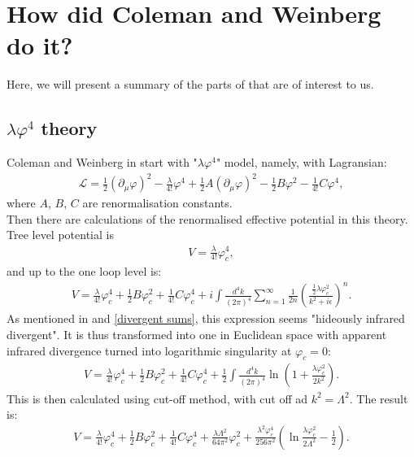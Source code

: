 \chapter{How did Coleman and Weinberg do it?}\label{CWchapter}
Here, we will present a summary of the parts of \citeColWein that are of interest to us. \\

\section{\texorpdfstring{$\lambda\varphi^4$}{Lambda phi to the fourth} theory}
Coleman and Weinberg in \cite{Coleman1973} start with "$\lambda\varphi^4$" model, namely, with 
Lagransian:
\begin{align}
\mathcal{L} = \frac{1}{2}(\partial_\mu\varphi)^2-\frac{\lambda}{4!}\varphi^4+\frac{1}{2}
A(\partial_\mu\varphi)^2-\frac{1}{2}B\varphi^2-\frac{1}{4!}C\varphi^4,
\end{align}
where $A$, $B$, $C$ are renormalisation constants. \\
Then there are calculations of the renormalised effective potential in this theory. \\
Tree level potential is
\begin{align}
V=\frac{\lambda}{4!}\varphi_c^4,
\end{align}
and up to the one loop level is:
\begin{align}
V = \frac{\lambda}{4!}\varphi_c^4+\frac{1}{2}B\varphi_c^2+\frac{1}{4!}C\varphi_c^4 + 
i\int\frac{d^4k}{(2\pi)^4}\sum\limits_{n=1}^\infty\frac{1}{2n}
\left(\frac{\frac{1}{2}\lambda\varphi_c^2}{k^2+i\epsilon}\right)^n.
\end{align} 
As mentioned in \cite{Coleman1973} and 
\ref{divergent sums}, this expression seems "hideously infrared divergent". It is thus transformed 
into one in Euclidean space with apparent infrared divergence turned into logarithmic 
singularity at $\varphi_c=0$:
\begin{align}
V=\frac{\lambda}{4!}\varphi_c^4+\frac{1}{2}B\varphi_c^2+\frac{1}{4!}C\varphi_c^4 +
\frac{1}{2}\int\frac{d^4k}{(2\pi)^4}\ln\left(1+\frac{\lambda\varphi_c^2}{2k^2}\right).
\end{align}
This is then calculated using cut-off method, with cut off ad $k^2 = \Lambda^2$. 
The result is:
\begin{align}
V=\frac{\lambda}{4!}\varphi_c^4+\frac{1}{2}B\varphi_c^2+\frac{1}{4!}C\varphi_c^4+
\frac{\lambda\Lambda^2}{64\pi^2}\varphi_c^2+\frac{\lambda^2\varphi_c^4}{256\pi^2}
\left(\ln\frac{\lambda\varphi_c^2}{2\Lambda^2}-\frac{1}{2}\right).
\end{align}
